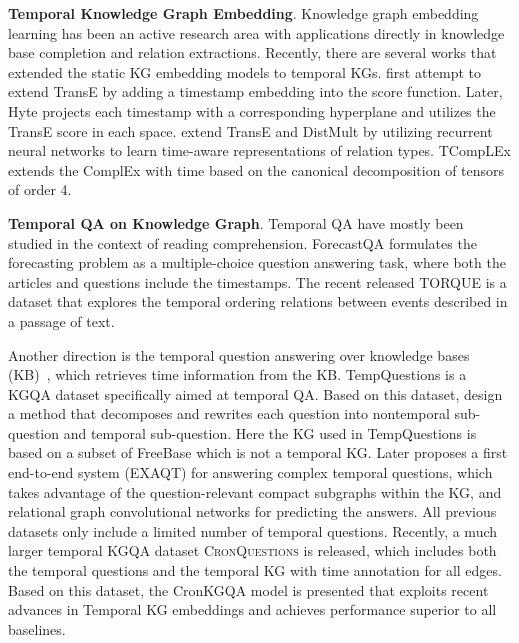 \documentclass[11pt]{article}
\newcommand{\xhdr}[1]{{\noindent\bfseries #1}.}
\begin{document}
\xhdr{Temporal Knowledge Graph Embedding}
Knowledge graph embedding learning \cite{bordes2013translating,yang2014embedding, trouillon2016complex, dettmers2018convolutional,shang2019end,sun2019rotate,tang2019orthogonal,ji2021survey} has been an active research area with applications directly in knowledge base completion and relation extractions.
Recently, there are several works that extended the static KG embedding models to temporal KGs. \citet{jiang2016towards} first attempt to extend TransE \cite{bordes2013translating} by adding a timestamp embedding into the score function. Later, Hyte \cite{dasgupta2018hyte} projects each timestamp with a corresponding hyperplane and utilizes the TransE score in each space. \citet{garcia2018learning} extend TransE and DistMult by utilizing recurrent neural networks to learn time-aware representations of relation types.
TCompLEx \cite{lacroix2020tensor} extends the ComplEx with time based on the canonical decomposition of tensors of order 4.


\xhdr{Temporal QA on Knowledge Graph}
Temporal QA have mostly been studied
in the context of reading comprehension. 
ForecastQA \cite{jin2021forecastqa} formulates the forecasting problem as a multiple-choice question answering task, where both the articles and questions include the timestamps. The recent released TORQUE \cite{ning2020torque} is a dataset that explores the temporal ordering relations between events described in a passage of text. 

Another direction is the temporal question answering over knowledge bases (KB)~\cite{jia2018tequila,jia2018tempquestions}, which retrieves time information from the KB. TempQuestions \cite{jia2018tempquestions} is a KGQA dataset specifically aimed at temporal QA. 
Based on this dataset, \citet{jia2018tequila} design a method that decomposes and rewrites each question into nontemporal sub-question and temporal sub-question. Here the KG used in TempQuestions is based on a subset of FreeBase which is not a temporal KG. Later \citet{jia2021complex} proposes a first end-to-end system (EXAQT) for answering complex temporal questions, which takes advantage of the question-relevant compact subgraphs within the KG, and relational graph convolutional networks \cite{schlichtkrull2018modeling} for predicting the answers. All previous datasets only include a limited number of temporal questions. 
Recently, a much larger %
temporal KGQA dataset \textsc{CronQuestions} \cite{saxena2021question} is released, which includes both the temporal questions and the temporal KG with time annotation for all edges.
Based on this dataset, the CronKGQA model \cite{saxena2021question} is presented that exploits recent advances in Temporal KG embeddings and achieves performance superior to all baselines. 
\end{document}
